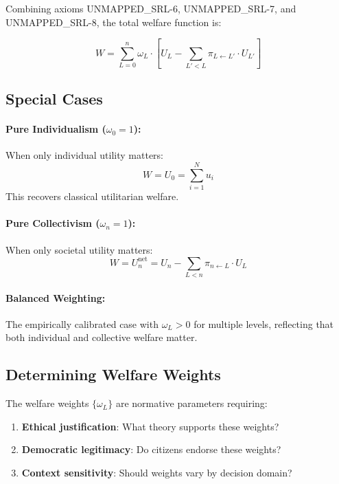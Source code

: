 Combining axioms UNMAPPED_SRL-6, UNMAPPED_SRL-7, and UNMAPPED_SRL-8, the total welfare function is:

\begin{equation}
W = \sum_{L=0}^{n} \omega_L \cdot \left[ U_L - \sum_{L' < L} \pi_{L \leftarrow L'} \cdot U_{L'} \right]
\label{eq:who-full-aggregation}
\end{equation}

\subsection{Special Cases}

\paragraph{Pure Individualism ($\omega_0 = 1$):}
When only individual utility matters:
\[
W = U_0 = \sum_{i=1}^{N} u_i
\]
This recovers classical utilitarian welfare.

\paragraph{Pure Collectivism ($\omega_n = 1$):}
When only societal utility matters:
\[
W = U_n^{\text{net}} = U_n - \sum_{L < n} \pi_{n \leftarrow L} \cdot U_L
\]

\paragraph{Balanced Weighting:}
The empirically calibrated case with $\omega_L > 0$ for multiple levels,
reflecting that both individual and collective welfare matter.

\subsection{Determining Welfare Weights}

The welfare weights $\{\omega_L\}$ are normative parameters requiring:

\begin{enumerate}
\item \textbf{Ethical justification}: What theory supports these weights?
\item \textbf{Democratic legitimacy}: Do citizens endorse these weights?
\item \textbf{Context sensitivity}: Should weights vary by decision domain?
\end{enumerate}

